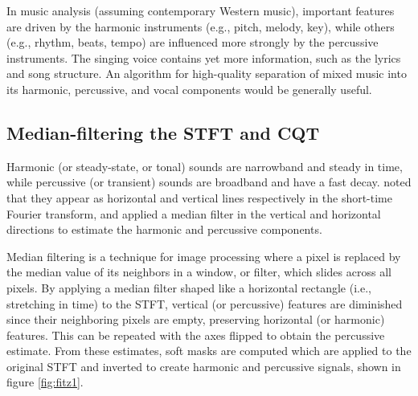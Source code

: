 \documentclass[letter,12pt]{article}
\begin{document}
In music analysis (assuming contemporary Western music), important features are driven by the harmonic instruments (e.g., pitch, melody, key), while others (e.g., rhythm, beats, tempo) are influenced more strongly by the percussive instruments. The singing voice contains yet more information, such as the lyrics and song structure. An algorithm for high-quality separation of mixed music into its harmonic, percussive, and vocal components would be generally useful.

\subsection{Median-filtering the STFT and CQT}

Harmonic (or steady-state, or tonal) sounds are narrowband and steady in time, while percussive (or transient) sounds are broadband and have a fast decay. \citet{fitzgerald1} noted that they appear as horizontal and vertical lines respectively in the short-time Fourier transform, and applied a median filter in the vertical and horizontal directions to estimate the harmonic and percussive components.

Median filtering is a technique for image processing where a pixel is replaced by the median value of its neighbors in a window, or filter, which slides across all pixels. By applying a median filter shaped like a horizontal rectangle (i.e., stretching in time) to the STFT, vertical (or percussive) features are diminished since their neighboring pixels are empty, preserving horizontal (or harmonic) features. This can be repeated with the axes flipped to obtain the percussive estimate. From these estimates, soft masks are computed which are applied to the original STFT and inverted to create harmonic and percussive signals, shown in figure \ref{fig:fitz1}.
\end{document}

